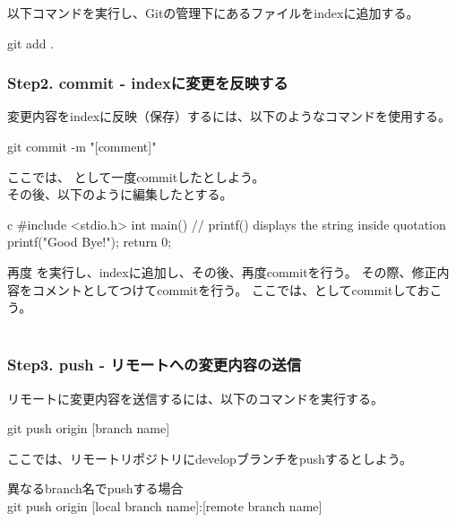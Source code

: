 \documentclass[10pt,a4j,openany,dvipdfmx]{jsarticle}
\begin{document}
以下コマンドを実行し、Gitの管理下にあるファイルをindexに追加する。
\begin{commandshell}
git add .
\end{commandshell}


\subsubsection{Step2. commit - indexに変更を反映する} %
\label{ssub:step2_commit_indexに変更を反映する}

変更内容をindexに反映（保存）するには、以下のようなコマンドを使用する。
\begin{commandshell}
git commit -m "[comment]"
\end{commandshell}

ここでは、  として一度commitしたとしよう。\\
その後、以下のように編集したとする。
\begin{numList}{c}
#include <stdio.h>
int main() {
   // printf() displays the string inside quotation
   printf("Good Bye!");
   return 0;
}
\end{numList}

再度  を実行し、indexに追加し、その後、再度commitを行う。
その際、修正内容をコメントとしてつけてcommitを行う。
ここでは、としてcommitしておこう。\\
\\

\subsubsection{Step3. push - リモートへの変更内容の送信} %
\label{ssub:step3_push_リモートへの変更内容の送信}

リモートに変更内容を送信するには、以下のコマンドを実行する。
\begin{commandshell}
git push origin [branch name]
\end{commandshell}

ここでは、リモートリポジトリにdevelopブランチをpushするとしよう。

異なるbranch名でpushする場合\\
git push origin [local branch name]:[remote branch name]
\end{document}
